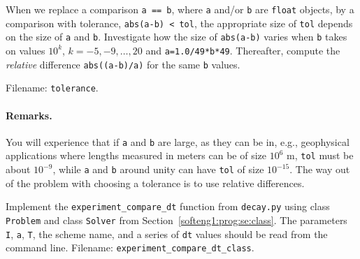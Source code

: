 \documentclass[graybox,sectrefs,envcountresetchap,open=right,final]{svmonodo}
\makeatletter
\newenvironment{doconceexercise}{}{}
\newcounter{doconceexercisecounter}%
\newcommand\listofexercises{
\chapter*{List of Exercises, Problems, and Projects
          \@mkboth{List of Exercises, Problems, and Projects}{List of Exercises, Problems, and Projects}}
\markboth{List of Exercises, Problems, and Projects}{List of Exercises, Problems, and Projects}
\@starttoc{loe}
}
\makeatother
\begin{document}
\begin{doconceexercise}

                
\label{softeng1:exer:tol}


When we replace a comparison \texttt{a == b}, where \texttt{a} and/or \texttt{b} are
\texttt{float} objects, by a comparison with tolerance, \texttt{abs(a-b) < tol},
the appropriate size of \texttt{tol} depends on the size of \texttt{a} and \texttt{b}.
Investigate how the size of \texttt{abs(a-b)} varies when \texttt{b} takes on
values $10^k$, $k=-5,-9,\ldots,20$ and \texttt{a=1.0/49*b*49}.
Thereafter, compute the \emph{relative} difference \texttt{abs((a-b)/a)} for
the same \texttt{b} values.

\noindent Filename: \texttt{tolerance}.


\paragraph{Remarks.}
You will experience that if \texttt{a} and \texttt{b} are large, as they can be
in, e.g.,
geophysical applications where lengths measured in meters can be of size
$10^6$ m, \texttt{tol} must be about $10^{-9}$, while \texttt{a} and \texttt{b} around unity can
have \texttt{tol} of size $10^{-15}$.
The way out of the problem with choosing a tolerance is to use
relative differences.

\end{doconceexercise}

\begin{doconceexercise}

                
\label{softeng1:exer:class:dts}

Implement the \Verb!experiment_compare_dt! function from \texttt{decay.py}
using class \texttt{Problem} and class \texttt{Solver} from
Section~\ref{softeng1:prog:se:class}.
The parameters \texttt{I}, \texttt{a}, \texttt{T}, the scheme name, and a series of
\texttt{dt} values should be read from the command line.
\noindent Filename: \Verb!experiment_compare_dt_class!.

\end{doconceexercise}
\end{document}
